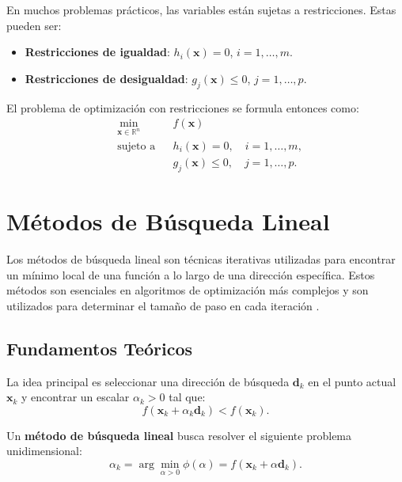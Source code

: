 En muchos problemas prácticos, las variables están sujetas a restricciones. Estas pueden ser:

\begin{itemize}
    \item \textbf{Restricciones de igualdad}: $h_i(\mathbf{x}) = 0$, $i = 1, \dots, m$.
    \item \textbf{Restricciones de desigualdad}: $g_j(\mathbf{x}) \leq 0$, $j = 1, \dots, p$.
\end{itemize}

El problema de optimización con restricciones se formula entonces como:
\begin{equation}
\begin{aligned}
& \min_{\mathbf{x} \in \mathbb{R}^n} & & f(\mathbf{x}) \\
& \text{sujeto a} & & h_i(\mathbf{x}) = 0, \quad i = 1, \dots, m, \\
& & & g_j(\mathbf{x}) \leq 0, \quad j = 1, \dots, p.
\end{aligned}
\end{equation}

\section{Métodos de Búsqueda Lineal}

Los métodos de búsqueda lineal son técnicas iterativas utilizadas para encontrar un mínimo local de una función a lo largo de una dirección específica. Estos métodos son esenciales en algoritmos de optimización más complejos y son utilizados para determinar el tamaño de paso en cada iteración \cite{wright1999numerical}.

\subsection{Fundamentos Teóricos}

La idea principal es seleccionar una dirección de búsqueda $\mathbf{d}_k$ en el punto actual $\mathbf{x}_k$ y encontrar un escalar $\alpha_k > 0$ tal que:
\begin{equation}
f(\mathbf{x}_k + \alpha_k \mathbf{d}_k) < f(\mathbf{x}_k).
\end{equation}

\begin{definicion}
\label{def:busqueda_lineal}
Un \textbf{método de búsqueda lineal} busca resolver el siguiente problema unidimensional:
\begin{equation}
\alpha_k = \arg\min_{\alpha > 0} \phi(\alpha) = f(\mathbf{x}_k + \alpha \mathbf{d}_k).
\end{equation}
\end{definicion}

